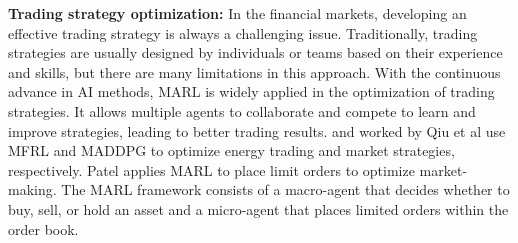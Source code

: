 \documentclass[acmsmall]{acmart}
\begin{document}
\textbf{Trading strategy optimization:} 
In the financial markets, developing an effective trading strategy is always a challenging issue. Traditionally, trading strategies are usually designed by individuals or teams based on their experience and skills, but there are many limitations in this approach. With the continuous advance in AI methods, MARL is widely applied in the optimization of trading strategies. It allows multiple agents to collaborate and compete to learn and improve strategies, leading to better trading results.
\cite{9931995} and \cite{qiu2021multi} worked by Qiu et al use MFRL \cite{pmlr-v80-yang18d} and MADDPG \cite{maddpg} to optimize energy trading and market strategies, respectively.
Patel \cite{patel2018optimizing} applies MARL to place limit orders to optimize market-making. The MARL framework consists of a macro-agent that decides whether to buy, sell, or hold an asset and a micro-agent that places limited orders within the order book. %
\end{document}
